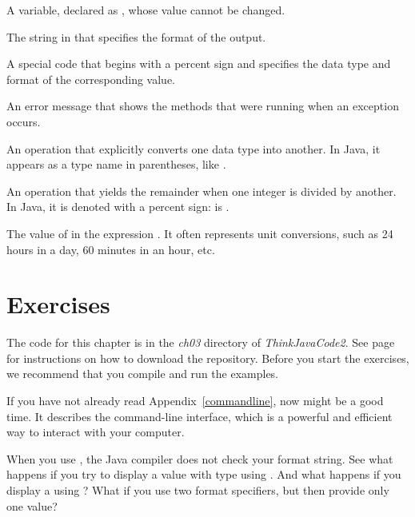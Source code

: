\begin{description}
A variable, declared as , whose value cannot be changed.

The string in  that specifies the format of the output.

A special code that begins with a percent sign and specifies the data type and format of the corresponding value.

An error message that shows the methods that were running when an exception occurs.

An operation that explicitly converts one data type into another.
In Java, it appears as a type name in parentheses, like .


An operation that yields the remainder when one integer is divided by another.
In Java, it is denoted with a percent sign:  is .

The value of  in the expression .
It often represents unit conversions, such as 24 hours in a day, 60 minutes in an hour, etc.

\end{description}


\section{Exercises}

The code for this chapter is in the {\it ch03} directory of {\it ThinkJavaCode2}.
See page~\pageref{code} for instructions on how to download the repository.
Before you start the exercises, we recommend that you compile and run the examples.

If you have not already read Appendix~\ref{commandline}, now might be a good time.
It describes the command-line interface, which is a powerful and efficient way to interact with your computer.


\begin{exercise}  %

When you use , the Java compiler does not check your format string.
See what happens if you try to display a value with type  using .
And what happens if you display a  using ?
What if you use two format specifiers, but then provide only one value?

\end{exercise}


